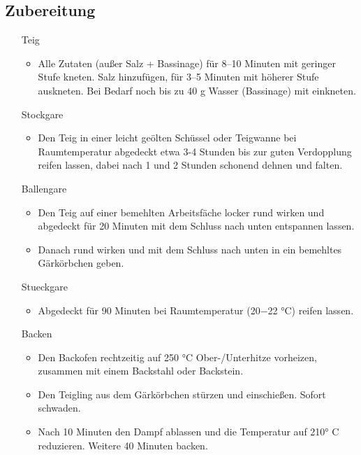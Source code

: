\documentclass[10pt,a4paper,ngerman, DIV=16]{scrartcl}
\begin{document}
\subsection*{Zubereitung}
\begin{enumerate}
    \item [Teig] 
    \begin{itemize}
        \item Alle Zutaten (außer Salz + Bassinage) für 8–10 Minuten mit geringer Stufe kneten. Salz hinzufügen, für 3–5 Minuten mit höherer Stufe auskneten. Bei Bedarf noch bis zu
        40 g Wasser (Bassinage) mit einkneten.
    \end{itemize}
    \item [\Gls{Stockgare}]
    \begin{itemize}
        \item Den Teig in einer leicht geölten Schüssel oder Teigwanne bei Raumtemperatur abgedeckt etwa 3-4 Stunden bis zur guten Verdopplung reifen lassen, dabei nach 1 und 2 Stunden schonend dehnen und falten.
    \end{itemize}
    \item [\Gls{Ballengare}]
    \begin{itemize}
        \item Den Teig auf einer bemehlten Arbeitsfäche locker rund wirken und abgedeckt für 20 Minuten mit dem Schluss nach unten entspannen lassen. 
        \item Danach rund wirken und mit dem Schluss nach unten in ein bemehltes Gärkörbchen geben.
    \end{itemize}
    \item [\Gls{Stueckgare}]
    \begin{itemize}
        \item Abgedeckt für 90 Minuten bei Raumtemperatur (20−22 °C) reifen lassen.
    \end{itemize}
    \item [Backen]
    \begin{itemize}
        \item Den Backofen rechtzeitig auf 250 °C Ober-/Unterhitze  vorheizen, zusammen mit einem Backstahl oder Backstein.
        \item Den Teigling aus dem Gärkörbchen stürzen und einschießen. Sofort schwaden. 
        \item Nach 10 Minuten den Dampf ablassen und die Temperatur auf 210° C reduzieren. Weitere 40 Minuten backen.
    \end{itemize}
\end{enumerate}
\end{document}
